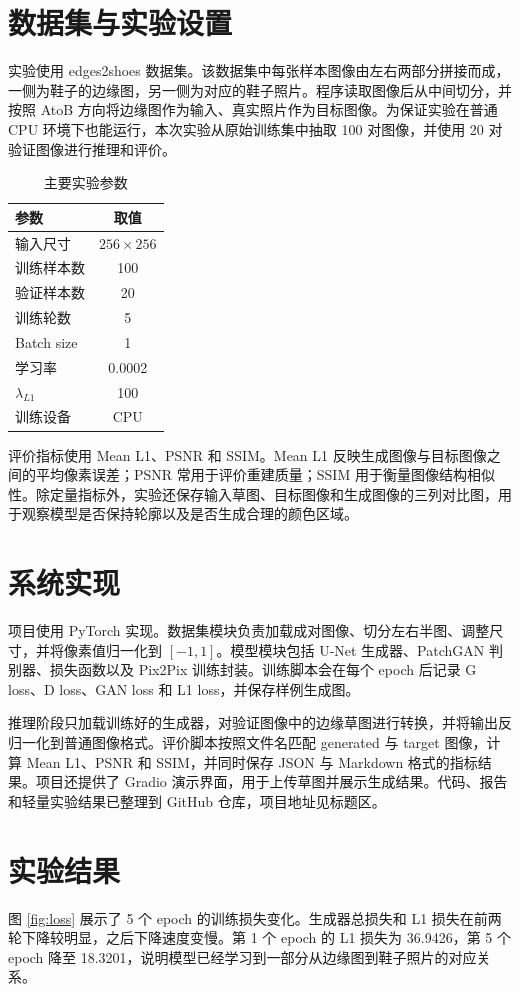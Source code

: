 \documentclass[UTF8,a4paper,twocolumn,10pt]{ctexart}
\begin{document}
\section{数据集与实验设置}
实验使用 edges2shoes 数据集。该数据集中每张样本图像由左右两部分拼接而成，一侧为鞋子的边缘图，另一侧为对应的鞋子照片。程序读取图像后从中间切分，并按照 AtoB 方向将边缘图作为输入、真实照片作为目标图像。为保证实验在普通 CPU 环境下也能运行，本次实验从原始训练集中抽取 100 对图像，并使用 20 对验证图像进行推理和评价。

\begin{table}[H]
\centering
\caption{主要实验参数}
\label{tab:setting}
\begin{tabular}{lc}
\toprule
参数 & 取值 \\
\midrule
输入尺寸 & $256\times256$ \\
训练样本数 & 100 \\
验证样本数 & 20 \\
训练轮数 & 5 \\
Batch size & 1 \\
学习率 & 0.0002 \\
$\lambda_{L1}$ & 100 \\
训练设备 & CPU \\
\bottomrule
\end{tabular}
\end{table}

评价指标使用 Mean L1、PSNR 和 SSIM。Mean L1 反映生成图像与目标图像之间的平均像素误差；PSNR 常用于评价重建质量；SSIM 用于衡量图像结构相似性。除定量指标外，实验还保存输入草图、目标图像和生成图像的三列对比图，用于观察模型是否保持轮廓以及是否生成合理的颜色区域。

\section{系统实现}
项目使用 PyTorch 实现。数据集模块负责加载成对图像、切分左右半图、调整尺寸，并将像素值归一化到 $[-1,1]$。模型模块包括 U-Net 生成器、PatchGAN 判别器、损失函数以及 Pix2Pix 训练封装。训练脚本会在每个 epoch 后记录 G loss、D loss、GAN loss 和 L1 loss，并保存样例生成图。

推理阶段只加载训练好的生成器，对验证图像中的边缘草图进行转换，并将输出反归一化到普通图像格式。评价脚本按照文件名匹配 generated 与 target 图像，计算 Mean L1、PSNR 和 SSIM，并同时保存 JSON 与 Markdown 格式的指标结果。项目还提供了 Gradio 演示界面，用于上传草图并展示生成结果。代码、报告和轻量实验结果已整理到 GitHub 仓库，项目地址见标题区。

\section{实验结果}
图 \ref{fig:loss} 展示了 5 个 epoch 的训练损失变化。生成器总损失和 L1 损失在前两轮下降较明显，之后下降速度变慢。第 1 个 epoch 的 L1 损失为 36.9426，第 5 个 epoch 降至 18.3201，说明模型已经学习到一部分从边缘图到鞋子照片的对应关系。
\end{document}
